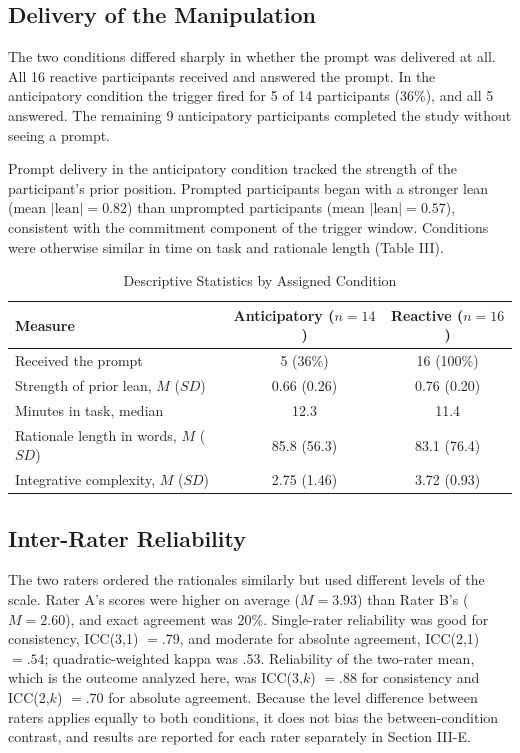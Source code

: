 \documentclass[12pt,letterpaper]{article}
\begin{document}
\subsection{Delivery of the Manipulation}
The two conditions differed sharply in whether the prompt was delivered at all. All 16 reactive participants received and answered the prompt. In the anticipatory condition the trigger fired for 5 of 14 participants (36\%), and all 5 answered. The remaining 9 anticipatory participants completed the study without seeing a prompt.

Prompt delivery in the anticipatory condition tracked the strength of the participant's prior position. Prompted participants began with a stronger lean (mean $|\mathrm{lean}| = 0.82$) than unprompted participants (mean $|\mathrm{lean}| = 0.57$), consistent with the commitment component of the trigger window. Conditions were otherwise similar in time on task and rationale length (Table III).

\begin{table}[ht]\centering\footnotesize
\caption{Descriptive Statistics by Assigned Condition}
\begin{tabular}{lcc}
\toprule
Measure & Anticipatory ($n = 14$) & Reactive ($n = 16$)\\
\midrule
Received the prompt & 5 (36\%) & 16 (100\%)\\
Strength of prior lean, $M$ ($SD$) & 0.66 (0.26) & 0.76 (0.20)\\
Minutes in task, median & 12.3 & 11.4\\
Rationale length in words, $M$ ($SD$) & 85.8 (56.3) & 83.1 (76.4)\\
Integrative complexity, $M$ ($SD$) & 2.75 (1.46) & 3.72 (0.93)\\
\bottomrule
\end{tabular}
\end{table}

\subsection{Inter-Rater Reliability}
The two raters ordered the rationales similarly but used different levels of the scale. Rater A's scores were higher on average ($M = 3.93$) than Rater B's ($M = 2.60$), and exact agreement was 20\%. Single-rater reliability was good for consistency, ICC(3,1) $= .79$, and moderate for absolute agreement, ICC(2,1) $= .54$; quadratic-weighted kappa was .53. Reliability of the two-rater mean, which is the outcome analyzed here, was ICC(3,$k$) $= .88$ for consistency and ICC(2,$k$) $= .70$ for absolute agreement. Because the level difference between raters applies equally to both conditions, it does not bias the between-condition contrast, and results are reported for each rater separately in Section III-E.
\end{document}
